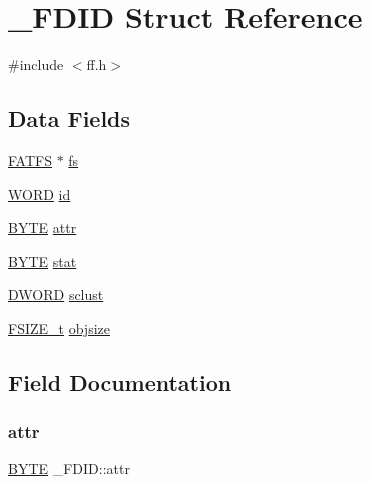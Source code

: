 \hypertarget{struct___f_d_i_d}{}\section{\+\_\+\+F\+D\+ID Struct Reference}
\label{struct___f_d_i_d}


{\ttfamily \#include $<$ff.\+h$>$}

\subsection*{Data Fields}
\begin{DoxyCompactItemize}
\item 
\mbox{\hyperlink{struct_f_a_t_f_s}{F\+A\+T\+FS}} $\ast$ \mbox{\hyperlink{struct___f_d_i_d_aefa4597d88e54bace32e6c15e11d9610}{fs}}
\item 
\mbox{\hyperlink{integer_8h_a197942eefa7db30960ae396d68339b97}{W\+O\+RD}} \mbox{\hyperlink{struct___f_d_i_d_a363d7bdab408418b911ac1502bc22ea6}{id}}
\item 
\mbox{\hyperlink{lz4_8c_a4ae1dab0fb4b072a66584546209e7d58}{B\+Y\+TE}} \mbox{\hyperlink{struct___f_d_i_d_a6912cfc1ea914d7b68a18b846065d790}{attr}}
\item 
\mbox{\hyperlink{lz4_8c_a4ae1dab0fb4b072a66584546209e7d58}{B\+Y\+TE}} \mbox{\hyperlink{struct___f_d_i_d_a1a2ff09f2ef172772f4e7312070be708}{stat}}
\item 
\mbox{\hyperlink{integer_8h_ad342ac907eb044443153a22f964bf0af}{D\+W\+O\+RD}} \mbox{\hyperlink{struct___f_d_i_d_ae2fbaaa31b5d12b333cb6d1ded099412}{sclust}}
\item 
\mbox{\hyperlink{ff_8h_a3fc0992ad7436250b6b1a0592214b7f2}{F\+S\+I\+Z\+E\+\_\+t}} \mbox{\hyperlink{struct___f_d_i_d_a27039b8d89a4a62efabab36e6b303819}{objsize}}
\end{DoxyCompactItemize}


\subsection{Field Documentation}
\mbox{\label{struct___f_d_i_d_a6912cfc1ea914d7b68a18b846065d790}} 
\subsubsection{\texorpdfstring{attr}{attr}}
{\footnotesize\ttfamily \mbox{\hyperlink{lz4_8c_a4ae1dab0fb4b072a66584546209e7d58}{B\+Y\+TE}} \+\_\+\+F\+D\+I\+D\+::attr}

